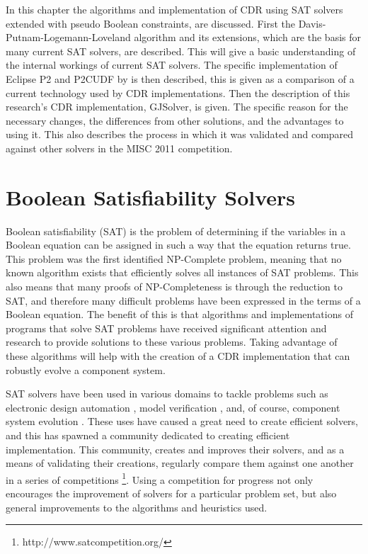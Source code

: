 In this chapter the algorithms and implementation of CDR using SAT solvers extended with pseudo Boolean constraints, are discussed.
First the Davis-Putnam-Logemann-Loveland algorithm \citep{Davis1960, davis1962machine} and its extensions, which are the basis for many current SAT solvers, are described.
This will give a basic understanding of the internal workings of current SAT solvers.
The specific implementation of Eclipse P2 and P2CUDF by \cite{leBerre2010} is then described,
this is given as a comparison of a current technology used by CDR implementations.
Then the description of this research's CDR implementation, GJSolver, is given.
The specific reason for the necessary changes, the differences from other solutions, and the advantages to using it.
This also describes the process in which it was validated and compared against other solvers in the MISC 2011 competition.

\section{Boolean Satisfiability Solvers}
\label{impl.SAT}
Boolean satisfiability (SAT) is the problem of determining if the variables in a Boolean equation can be assigned in such a way that the equation returns true.
This problem was the first identified NP-Complete problem, meaning that no known algorithm exists that efficiently solves all instances of SAT problems.
This also means that many proofs of NP-Completeness is through the reduction to SAT, and therefore many difficult problems have been expressed in the terms of a Boolean equation.
The benefit of this is that algorithms and implementations of programs that solve SAT problems have received significant attention and research to provide solutions to these various problems.
Taking advantage of these algorithms will help with the creation of a CDR implementation that can robustly evolve a component system.

SAT solvers have been used in various domains to tackle problems such as electronic design automation \citep{Marques-Silva2000}, 
model verification \citep{dennis2006}, and, of course, component system evolution \citep{leBerre2010}.
These uses have caused a great need to create efficient solvers, and this has spawned a community dedicated to creating efficient implementation.
This community, creates and improves their solvers, 
and as a means of validating their creations, regularly compare them against one another in a series of competitions \footnote{http://www.satcompetition.org/}.
Using a competition for progress not only encourages the improvement of solvers for a particular problem set, but also general improvements to the algorithms and heuristics used. 

